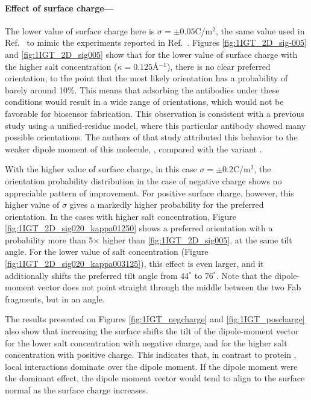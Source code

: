  \medskip
 
 \paragraph*{Effect of surface charge---}
 
The lower value of surface charge here is $\sigma=\pm 0.05$C/m$^2$, the same value used in Ref.~ to mimic the experiments reported in Ref.~. Figures \ref{fig:1IGT_2D_sig-005} and \ref{fig:1IGT_2D_sig005} show that for the lower value of surface charge with the higher salt concentration ($\kappa=0.125$\AA$^{-1}$), there is no clear preferred orientation, to the point that the most likely orientation has a probability of barely around 10\%. This means that adsorbing the antibodies under these conditions would result in a wide range of orientations, which would not be favorable for biosensor fabrication. This observation is consistent with a previous study using a unified-residue model,\cite{ZhouChenJiang2003} where this particular antibody showed many possible orientations. The authors of that study attributed this behavior to the weaker dipole moment of this molecule, , compared with the variant .
 
 With the higher value of surface charge, in this case $\sigma=\pm0.2$C/m$^2$, the orientation probability distribution in the case of negative charge shows no appreciable pattern of improvement.
 For positive surface charge, however, this higher value of $\sigma$ gives a markedly higher probability for the preferred orientation.
In the cases with higher salt concentration, Figure \ref{fig:1IGT_2D_sig020_kappa01250} shows a preferred orientation with a probability more than 5$\times$ higher than \ref{fig:1IGT_2D_sig005}, at the same tilt angle. For the lower value of salt concentration (Figure \ref{fig:1IGT_2D_sig020_kappa003125}), this effect is even larger, and it additionally shifts the preferred tilt angle from $44^{\circ}$ to $76^{\circ}$. Note that the dipole-moment vector does not point straight through the middle between the two Fab fragments, but in an angle.
 
The results presented on Figures \ref{fig:1IGT_negcharge} and \ref{fig:1IGT_poscharge} also show that increasing the surface shifts the tilt of the dipole-moment vector for the lower salt concentration with negative charge, and for the higher salt concentration with positive charge. This indicates that, in contrast to protein \gb, local interactions dominate over the dipole moment. If the dipole moment were the dominant effect, the dipole moment vector would tend to align to the surface normal as the surface charge increases.
 
